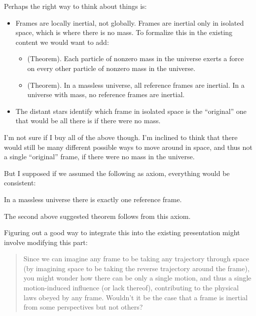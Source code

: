 \documentclass{article}
\begin{document}
Perhaps the right way to think about things is:

\begin{itemize}
    \item Frames are locally inertial, not globally. Frames are inertial only in isolated space, which is where there is no mass. To formalize this in the existing content we would want to add:
    \begin{itemize}
        \item (Theorem). Each particle of nonzero mass in the universe exerts a force on every other particle of nonzero mass in the universe.
        \item (Theorem). In a massless universe, all reference frames are inertial. In a universe with mass, no reference frames are inertial.
    \end{itemize}
    \item The distant stars identify which frame in isolated space is the ``original'' one that would be all there is if there were no mass.
\end{itemize}

I'm not sure if I buy all of the above though. I'm inclined to think that there would still be many different possible ways to move around in space, and thus not a single ``original'' frame, if there were no mass in the universe.

But I supposed if we assumed the following as axiom, everything would be consistent:

\begin{axiom}
    In a massless universe there is exactly one reference frame.
\end{axiom}

The second above suggested theorem follows from this axiom.

Figuring out a good way to integrate this into the existing presentation might involve modifying this part:

\begin{quote}
    Since we can imagine any frame to be taking any trajectory through space (by imagining space to be taking the reverse trajectory around the frame), you might wonder how there can be only a single motion, and thus a single motion-induced influence (or lack thereof), contributing to the physical laws obeyed by any frame. Wouldn't it be the case that a frame is inertial from some perspectives but not others?
\end{quote}

\newpage
\end{document}
